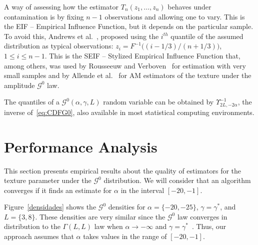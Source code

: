 \documentclass[twocolumn]{svjour3}
\begin{document}
	A way of assessing how the estimator $T_n(z_1,\dots,z_n)$ behaves under contamination is by fixing $n-1$ observations and allowing one to vary.
	This is the EIF -- Empirical Influence Function, but it depends on the particular sample.
	To avoid this, Andrews et al.~\cite{Andrews1972}, proposed using the $i^{th}$ quantile of the assumed distribution as typical observations: $z_i=F^{-1}\big((i-1/3)/(n+1/3) \big)$, $1\leq i\leq n-1$.
	This is the SEIF -- Stylized Empirical Influence Function that, among others, was used by Rousseeuw and Verboven~\cite{RousseeuwCSDA} for estimation with very small samples and by Allende et al.~\cite{AllendeFreryetal:JSCS:05} for AM estimators of the texture under the amplitude $\mathcal G^0$ law.
	
	The quantiles of a $\mathcal G^0(\alpha,\gamma,L)$ random variable can be obtained by $\Upsilon^{-1}_{2L,-2\alpha}$, the inverse of~\eqref{eq:CDFG0}, also available in most statistical computing environments.
	
	
	\section{Performance Analysis}\label{simulation}
	
	This section presents empirical results about the quality of estimators for the texture parameter under the $\mathcal G^0$ distribution. 
	We will consider that an algorithm converges if it finds an estimate for $\alpha$ in the interval $[-20,-1]$.    
	
	Figure~\ref{densidades} shows the $\mathcal{G}^0$ densities for  $\alpha=\{-20,-25\}$, $\gamma=\gamma^*$, and $L=\{3,8\}$. 
	These densities are very similar since the $\mathcal{G}^0$ law converges in distribution to the $\Gamma(L,L)$ law when $\alpha \to -\infty$ and $\gamma=\gamma^*$~\cite{Frery99}. 
	Thus, our approach assumes that $\alpha$ takes values in the range of $[-20,-1]$. 
	
\end{document}
